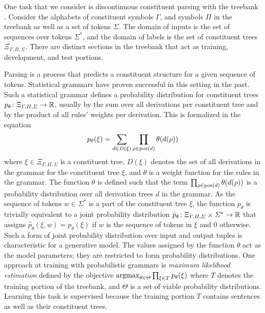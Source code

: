 \documentclass[../document.tex]{subfiles}
\begin{document}
    \begin{example}
        One task that we consider is discontinuous constituent parsing with the \negra{} treebank \citep{Skut98}.
        Consider the alphabets of constituent symbols \(\varGamma\), and  symbols \(\varPi\) in the \negra{} treebank as well as a set of tokens \(\varSigma\).
        The domain of inputs is the set of sequences over tokens \(\varSigma^*\), and the domain of labels is the set of constituent trees \(\Xi_{\varGamma, \varPi, \varSigma}\).
        There are distinct sections in the \negra{} treebank that act as training, development, and test portions.

        Parsing is a process that predicts a constituent structure for a given sequence of tokens.
        Statistical grammars have proven successful in this setting in the past.
        Such a statistical grammar defines a probability distribution for constituent trees \(p_{\theta}\colon \Xi_{\varGamma, \varPi, \varSigma} \to \mathbb{R}\), usually by the sum over all derivations per constituent tree and by the product of all rules' weights per derivation.
        This is formalized in the equation \[
        p_{\theta}(\xi) = \sum_{d \in D(\xi)} \prod_{\rho \in \operatorname{pos}(d)} \theta(d(\rho))
        \]
        where \(\xi \in \Xi_{\varGamma, \varPi, \varSigma}\) is a constituent tree, \(D(\xi)\) denotes the set of all derivations in the grammar for the constituent tree \(\xi\), and \(\theta\) is a weight function for the rules in the grammar.
        The function \(\theta\) is defined such that the term \(\prod_{\rho \in \operatorname{pos}(d)} \theta(d(\rho))\) is a probability distribution over all derivation trees \(d\) in the grammar.
        As the sequence of tokens \(w \in \varSigma^*\) is a part of the constituent tree \(\xi\), the function \(p_{\theta}\) is trivially equivalent to a joint probability distribution \(\hat{p}_\theta\colon \Xi_{\varGamma, \varPi, \varSigma} \times \varSigma^* \to \mathbb{R}\) that assigns \(\hat{p}_\theta(\xi, w) = p_\theta(\xi)\) if \(w\) is the sequence of tokens in \(\xi\) and \(0\) otherwise.
        Such a form of joint probability distribution over input and output tuples is characteristic for a generative model.
        The values assigned by the function \(\theta\) act as the model parameters; they are restricted to form probability distributions.
        One approach at training with probabilistic grammars is \emph{maximum likelihood estimation} defined by the objective \(\operatorname{arg max}_{\theta \in \varTheta} \prod_{\xi \in T} p_{\theta}(\xi)\) where \(T\) denotes the training portion of the treebank, and \(\varTheta\) is a set of viable probability distributions.
        Learning this task is supervised because the training portion \(T\) contains sentences as well as their constituent trees.
    \end{example}
\end{document}
